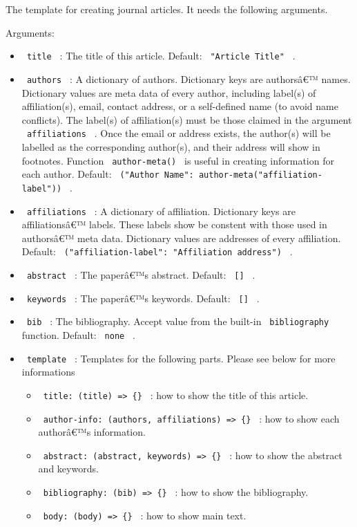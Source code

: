 The template for creating journal articles. It needs the following
arguments.

Arguments:

\begin{itemize}
\tightlist
\item
  \texttt{\ title\ } : The title of this article. Default:
  \texttt{\ "Article\ Title"\ } .
\item
  \texttt{\ authors\ } : A dictionary of authors. Dictionary keys are
  authorsâ€™ names. Dictionary values are meta data of every author,
  including label(s) of affiliation(s), email, contact address, or a
  self-defined name (to avoid name conflicts). The label(s) of
  affiliation(s) must be those claimed in the argument
  \texttt{\ affiliations\ } . Once the email or address exists, the
  author(s) will be labelled as the corresponding author(s), and their
  address will show in footnotes. Function \texttt{\ author-meta()\ } is
  useful in creating information for each author. Default:
  \texttt{\ ("Author\ Name":\ author-meta("affiliation-label"))\ } .
\item
  \texttt{\ affiliations\ } : A dictionary of affiliation. Dictionary
  keys are affiliationsâ€™ labels. These labels show be constent with
  those used in authorsâ€™ meta data. Dictionary values are addresses of
  every affiliation. Default:
  \texttt{\ ("affiliation-label":\ "Affiliation\ address")\ } .
\item
  \texttt{\ abstract\ } : The paperâ€™s abstract. Default:
  \texttt{\ {[}{]}\ } .
\item
  \texttt{\ keywords\ } : The paperâ€™s keywords. Default:
  \texttt{\ {[}{]}\ } .
\item
  \texttt{\ bib\ } : The bibliography. Accept value from the built-in
  \texttt{\ bibliography\ } function. Default: \texttt{\ none\ } .
\item
  \texttt{\ template\ } : Templates for the following parts. Please see
  below for more informations

  \begin{itemize}
  \tightlist
  \item
    \texttt{\ title:\ (title)\ =\textgreater{}\ \{\}\ } : how to show
    the title of this article.
  \item
    \texttt{\ author-info:\ (authors,\ affiliations)\ =\textgreater{}\ \{\}\ }
    : how to show each authorâ€™s information.
  \item
    \texttt{\ abstract:\ (abstract,\ keywords)\ =\textgreater{}\ \{\}\ }
    : how to show the abstract and keywords.
  \item
    \texttt{\ bibliography:\ (bib)\ =\textgreater{}\ \{\}\ } : how to
    show the bibliography.
  \item
    \texttt{\ body:\ (body)\ =\textgreater{}\ \{\}\ } : how to show main
    text.
  \end{itemize}
\end{itemize}

